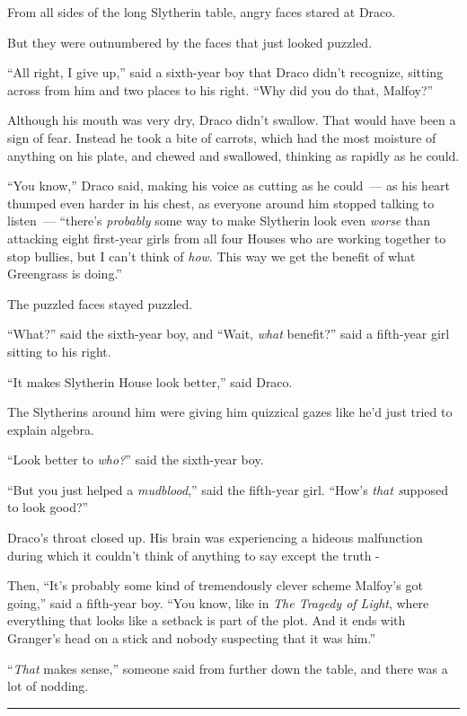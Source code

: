From all sides of the long Slytherin table, angry faces stared at Draco.

But they were outnumbered by the faces that just looked puzzled.

``All right, I give up,'' said a sixth-year boy that Draco didn't recognize, sitting across from him and two places to his right. ``Why did you do that, Malfoy?''

Although his mouth was very dry, Draco didn't swallow. That would have been a sign of fear. Instead he took a bite of carrots, which had the most moisture of anything on his plate, and chewed and swallowed, thinking as rapidly as he could.

``You know,'' Draco said, making his voice as cutting as he could~--- as his heart thumped even harder in his chest, as everyone around him stopped talking to listen~--- ``there's \emph{probably} some way to make Slytherin look even \emph{worse} than attacking eight first-year girls from all four Houses who are working together to stop bullies, but I can't think of \emph{how}. This way we get the benefit of what Greengrass is doing.''

The puzzled faces stayed puzzled.

``What?'' said the sixth-year boy, and ``Wait, \emph{what} benefit?'' said a fifth-year girl sitting to his right.

``It makes Slytherin House look better,'' said Draco.

The Slytherins around him were giving him quizzical gazes like he'd just tried to explain algebra.

``Look better to \emph{who?}'' said the sixth-year boy.

``But you just helped a \emph{mudblood},'' said the fifth-year girl. ``How's \emph{that s}upposed to look good?''

Draco's throat closed up. His brain was experiencing a hideous malfunction during which it couldn't think of anything to say except the truth -

Then, ``It's probably some kind of tremendously clever scheme Malfoy's got going,'' said a fifth-year boy. ``You know, like in \emph{The Tragedy of Light}, where everything that looks like a setback is part of the plot. And it ends with Granger's head on a stick and nobody suspecting that it was him.''

``\emph{That} makes sense,'' someone said from further down the table, and there was a lot of nodding.

\begin{center}\rule{3in}{0.4pt}\end{center}

